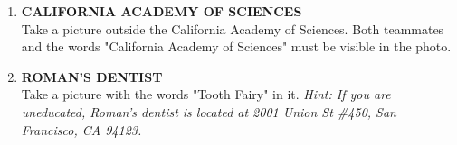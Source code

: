 \documentclass{article}
\begin{document}
\begin{enumerate}
    \item \textbf{CALIFORNIA ACADEMY OF SCIENCES} \\
    Take a picture outside the California Academy of Sciences. Both teammates and the words "California Academy of Sciences" must be visible in the photo.

    \item \textbf{ROMAN'S DENTIST} \\
    Take a picture with the words "Tooth Fairy" in it. \textit{Hint: If you are uneducated, Roman's dentist is located at 2001 Union St \#450, San Francisco, CA 94123.}
    
\end{enumerate}
\end{document}
